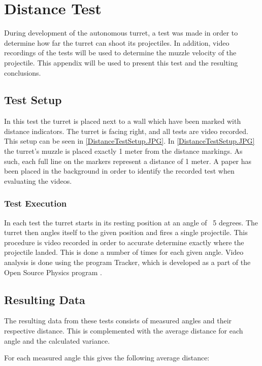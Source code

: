 \chapter{Distance Test}\label{AppendixDistTest}
During development of the autonomous turret, a test was made in order to
determine how far the turret can shoot its projectiles. In addition, video
recordings of the tests will be used to determine the muzzle velocity of the
projectile. This appendix will be used to present this test and the resulting
conclusions.

\section{Test Setup}
In this test the turret is placed next to a wall which have been marked with
distance indicators. The turret is facing right, and all tests are video
recorded. This setup can be seen in \autoref{DistanceTestSetup.JPG}.
 In \autoref{DistanceTestSetup.JPG} the turret's muzzle is placed exactly 1 meter
from the distance markings. As such, each full line on the markers represent a
distance of 1 meter. A paper has been placed in the background in order to
identify the recorded test when evaluating the videos. 

\subsection{Test Execution}
In each test the turret starts in its resting position at an angle of ~5
degrees. The turret then angles itself to the given position and fires a single
projectile. This procedure is video recorded in order to accurate determine
exactly where the projectile landed. This is done a number of times for each
given angle. Video analysis is done using the program Tracker, which is
developed as a part of the Open Source Physics program \cite{Tracker}.

\section{Resulting Data}
The resulting data from these tests consists of measured angles and their
respective distance. This is complemented with the average distance for each
angle and the calculated variance.

For each measured angle this gives the following average distance:

